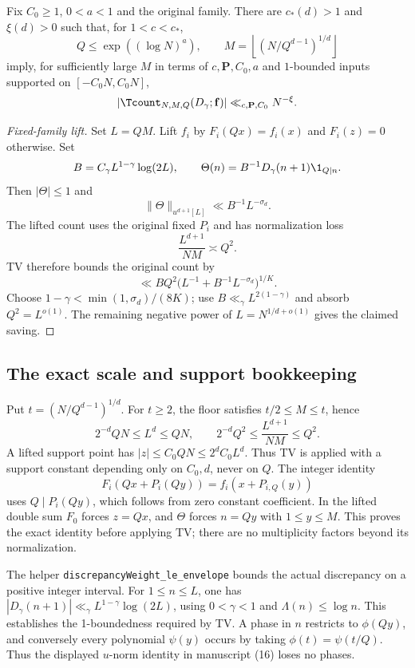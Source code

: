 \begin{proposition}\label{p:comparison}
\leanok
Fix $C_0\geq1$, $0<a<1$ and the original family. There are $c_*(d)>1$ and $\xi(d)>0$ such that, for $1<c<c_*$,
\[
 Q\leq\exp((\log N)^a),\qquad
 M=\left\lfloor(N/Q^{d-1})^{1/d}\right\rfloor
\]
imply, for sufficiently large $M$ in terms of $c,\mathbf P,C_0,a$ and $1$-bounded inputs supported on $[-C_0N,C_0N]$,
\[
 |\Tcount_{N,M,Q}(D_\gamma;\mathbf f)|\ll_{c,\mathbf P,C_0}N^{-\xi}.
\]
\end{proposition}
\begin{proof}[Fixed-family lift]
\leanok
Set $L=QM$. Lift $f_i$ by $F_i(Qx)=f_i(x)$ and $F_i(z)=0$ otherwise. Set
\[
 B=C_\gamma L^{1-\gamma}\log(2L),\qquad
 \Theta(n)=B^{-1}D_\gamma(n+1)\1_{Q\mid n}.
\]
Then $|\Theta|\leq1$ and
\[
 \|\Theta\|_{u^{d+1}[L]}\ll B^{-1}L^{-\sigma_d}.
\]
The lifted count uses the original fixed $P_i$ and has normalization loss
\[
 \frac{L^{d+1}}{NM}\asymp Q^2.
\]
TV therefore bounds the original count by
\[
 \ll BQ^2\bigl(L^{-1}+B^{-1}L^{-\sigma_d}\bigr)^{1/K}.
\]
Choose $1-\gamma<\min(1,\sigma_d)/(8K)$; use $B\ll_\gamma L^{2(1-\gamma)}$ and absorb $Q^2=L^{o(1)}$. The remaining negative power of $L=N^{1/d+o(1)}$ gives the claimed saving.
\end{proof}
\ifDetailed
\subsection*{The exact scale and support bookkeeping}
Put $t=(N/Q^{d-1})^{1/d}$. For $t\geq2$, the floor satisfies $t/2\leq M\leq t$, hence
\[
 2^{-d}QN\leq L^d\leq QN,\qquad
 2^{-d}Q^2\leq\frac{L^{d+1}}{NM}\leq Q^2.
\]
A lifted support point has $|z|\leq C_0QN\leq2^dC_0L^d$. Thus TV is applied with a support constant depending only on $C_0,d$, never on $Q$. The integer identity
\[
 F_i(Qx+P_i(Qy))=f_i(x+P_{i,Q}(y))
\]
uses $Q\mid P_i(Qy)$, which follows from zero constant coefficient. In the lifted double sum $F_0$ forces $z=Qx$, and $\Theta$ forces $n=Qy$ with $1\leq y\leq M$. This proves the exact identity before applying TV; there are no multiplicity factors beyond its normalization.

The helper \texttt{discrepancyWeight\_\allowbreak{}le\_\allowbreak{}envelope} bounds the actual discrepancy on a positive integer interval. For $1\leq n\leq L$, one has $|D_\gamma(n+1)|\ll_\gamma L^{1-\gamma}\log(2L)$, using $0<\gamma<1$ and $\Lambda(n)\leq\log n$. This establishes the 1-boundedness required by TV. A phase in $n$ restricts to $\phi(Qy)$, and conversely every polynomial $\psi(y)$ occurs by taking $\phi(t)=\psi(t/Q)$. Thus the displayed $u$-norm identity in manuscript (16) loses no phases.


